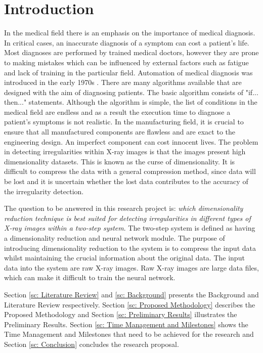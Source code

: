 \documentclass[11pt]{article}
\begin{document}
	\section{Introduction}
	In the medical field there is an emphasis on the importance of medical diagnosis. In critical cases, an inaccurate diagnosis of a symptom can cost a patient's life. Most diagnoses are performed by trained medical doctors, however they are prone to making mistakes which can be influenced by external factors such as fatigue and lack of training in the particular field. Automation of medical diagnosis was introduced in the early 1970s \cite{Ramesh2004}. There are many algorithms available that are designed with the aim of diagnosing patients. The basic algorithm consists of "if... then..." statements. Although the algorithm is simple, the list of conditions in the medical field are endless and as a result the execution time to diagnose a patient's symptoms is not realistic. In the manufacturing field, it is crucial to ensure that all manufactured components are flawless and are exact to the engineering design. An imperfect component can cost innocent lives. The problem in detecting irregularities within X-ray images is that the images present high dimensionality datasets. This is known as the curse of dimensionality. It is difficult to compress the data with a general compression method, since data will be lost and it is uncertain whether the lost data contributes to the accuracy of the irregularity detection.
	
	The question to be answered in this research project is: \textit{which dimensionality reduction technique is best suited for detecting irregularities in different types of X-ray images within a two-step system}. The two-step system is defined as having a dimensionality reduction and neural network module. The purpose of introducing dimensionality reduction to the system is to compress the input data whilst maintaining the crucial information about the original data. The input data into the system are raw X-ray images. Raw X-ray images are large data files, which can make it difficult to train the neural network.
	
	Section \ref{sc: Literature Review} and \ref{sc: Background} presents the Background and Literature Review respectively. Section \ref{sc: Proposed Methodology} describes the Proposed Methodology and Section \ref{sc: Preliminary Results} illustrates the Preliminary Results. Section \ref{sc: Time Management and Milestones} shows the Time Management and Milestones that need to be achieved for the research and Section \ref{sc: Conclusion} concludes the research proposal. 
	
\end{document}
